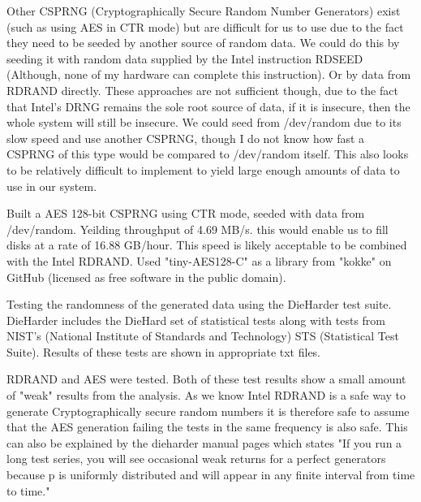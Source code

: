 \documentclass{paper}
\begin{document}
			
			Other CSPRNG (Cryptographically Secure Random Number Generators) exist (such as
			using AES in CTR mode) but are difficult for us to use due to the fact they need 
			to be seeded by another source of random data. We could do this by seeding it 
			with random data supplied by the Intel instruction RDSEED (Although, none of my 
			hardware can complete this instruction). Or by data from RDRAND directly. These 
			approaches are not sufficient though, due to the fact that Intel's DRNG remains 
			the sole root source of data, if it is insecure, then the whole system will 
			still be insecure. We could seed from /dev/random due to its slow speed and use 
			another CSPRNG, though I do not know how fast a CSPRNG of this type would be 
			compared to /dev/random itself. This also looks to be relatively difficult to 
			implement to yield large enough amounts of data to use in our system.
			
		Built a AES 128-bit CSPRNG using CTR mode, seeded with data from /dev/random.
		Yeilding throughput of 4.69 MB/s. this would enable us to fill disks at a rate of 16.88 GB/hour. This speed is likely acceptable to be combined with the Intel RDRAND. Used "tiny-AES128-C" as a library from "kokke" on GitHub (licensed as free software in the public domain).
			
			
		Testing the randomness of the generated data using the DieHarder test suite. 
		DieHarder includes the DieHard set of statistical tests along with tests from 
		NIST's (National Institute of Standards and Technology) STS (Statistical Test 
			Suite). Results of these tests are shown in appropriate txt files.
			
		RDRAND and AES were tested. Both of these test results show a small amount of 
		"weak" results from the analysis. As we know Intel RDRAND is a safe way to generate Cryptographically secure random numbers it is therefore safe to assume that the AES generation failing the tests in the same frequency is also safe.
		This can also be explained by the dieharder manual pages which states
		"If you run a long test series, you will see occasional weak returns for a perfect generators because p is uniformly distributed and will appear in any finite interval from time to time."
						
\end{document}
